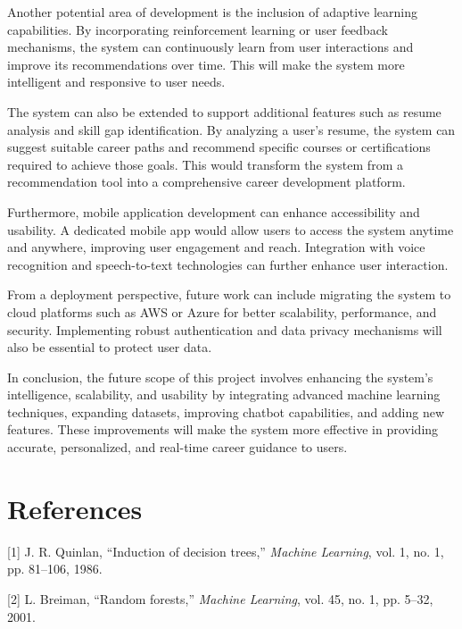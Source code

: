 \documentclass[12pt,a4paper]{report}
\begin{document}
{Another potential area of development is the inclusion of adaptive learning capabilities. By incorporating reinforcement learning or user feedback mechanisms, the system can continuously learn from user interactions and improve its recommendations over time. This will make the system more intelligent and responsive to user needs.

The system can also be extended to support additional features such as resume analysis and skill gap identification. By analyzing a user's resume, the system can suggest suitable career paths and recommend specific courses or certifications required to achieve those goals. This would transform the system from a recommendation tool into a comprehensive career development platform.

Furthermore, mobile application development can enhance accessibility and usability. A dedicated mobile app would allow users to access the system anytime and anywhere, improving user engagement and reach. Integration with voice recognition and speech-to-text technologies can further enhance user interaction.

From a deployment perspective, future work can include migrating the system to cloud platforms such as AWS or Azure for better scalability, performance, and security. Implementing robust authentication and data privacy mechanisms will also be essential to protect user data.

In conclusion, the future scope of this project involves enhancing the system’s intelligence, scalability, and usability by integrating advanced machine learning techniques, expanding datasets, improving chatbot capabilities, and adding new features. These improvements will make the system more effective in providing accurate, personalized, and real-time career guidance to users.

\clearpage
\chapter{References}

\setlength{\parindent}{0pt}
\justifying

[1] J. R. Quinlan, “Induction of decision trees,” \textit{Machine Learning}, vol. 1, no. 1, pp. 81–106, 1986.

\vspace{0.3cm}

[2] L. Breiman, “Random forests,” \textit{Machine Learning}, vol. 45, no. 1, pp. 5–32, 2001.

}
\end{document}
